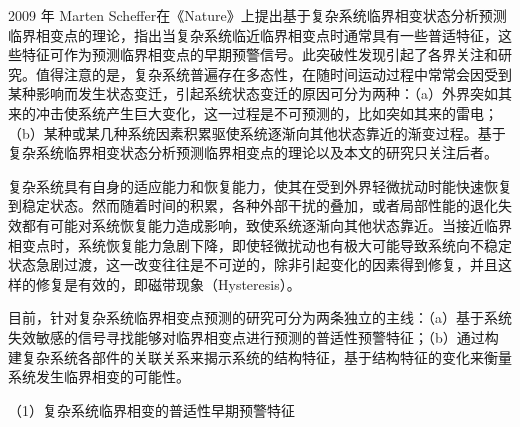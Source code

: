 2009 年 Marten Scheffer在《Nature》上提出基于复杂系统临界相变状态分析预测临界相变点的理论，指出当复杂系统临近临界相变点时通常具有一些普适特征，这些特征可作为预测临界相变点的早期预警信号\cite{scheffer2009critical}。此突破性发现引起了各界关注和研究\cite{scheffer2009early,scheffer2012anticipating}。值得注意的是，复杂系统普遍存在多态性，在随时间运动过程中常常会因受到某种影响而发生状态变迁，引起系统状态变迁的原因可分为两种：（a）外界突如其来的冲击使系统产生巨大变化，这一过程是不可预测的，比如突如其来的雷电；（b）某种或某几种系统因素积累驱使系统逐渐向其他状态靠近的渐变过程。基于复杂系统临界相变状态分析预测临界相变点的理论以及本文的研究只关注后者。

复杂系统具有自身的适应能力和恢复能力，使其在受到外界轻微扰动时能快速恢复到稳定状态。然而随着时间的积累，各种外部干扰的叠加，或者局部性能的退化失效都有可能对系统恢复能力造成影响，致使系统逐渐向其他状态靠近。当接近临界相变点时，系统恢复能力急剧下降，即使轻微扰动也有极大可能导致系统向不稳定状态急剧过渡，这一改变往往是不可逆的，除非引起变化的因素得到修复，并且这样的修复是有效的，即磁带现象（Hysteresis）\cite{mayergoyz2003mathematical}。

目前，针对复杂系统临界相变点预测的研究可分为两条独立的主线：（a）基于系统失效敏感的信号寻找能够对临界相变点进行预测的普适性预警特征；（b）通过构建复杂系统各部件的关联关系来揭示系统的结构特征，基于结构特征的变化来衡量系统发生临界相变的可能性\cite{scheffer2012anticipating}。

（1）复杂系统临界相变的普适性早期预警特征

